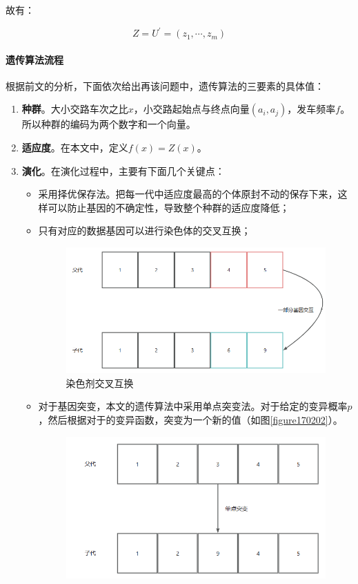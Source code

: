 故有：

\begin{equation}
    Z = U^{'}=(z_1,\cdots,z_m)
\end{equation}

\paragraph{遗传算法流程}

根据前文的分析，下面依次给出再该问题中，遗传算法的三要素的具体值：

\begin{enumerate}
    \item \textbf{种群}。大小交路车次之比$x$，小交路起始点与终点向量$(a_i, a_j)$，发车频率$f$。所以种群的编码为两个数字和一个向量。
    \item \textbf{适应度}。在本文中，定义$f(x)=Z(x)$。
    \item \textbf{演化}。在演化过程中，主要有下面几个关键点：
    \begin{itemize}
        \item 采用择优保存法。把每一代中适应度最高的个体原封不动的保存下来，这样可以防止基因的不确定性，导致整个种群的适应度降低；
        \item 只有对应的数据基因可以进行染色体的交叉互换；
        \begin{figure}[h]
            \centering
            \includegraphics[scale=0.4]{res/figure170220.png}
            \caption{染色剂交叉互换}
            \label{figure170220}
        \end{figure}
        \item 对于基因突变，本文的遗传算法中采用单点突变法。对于给定的变异概率$p$，然后根据对于的变异函数，突变为一个新的值（如图\ref{figure170202}）。
        \begin{figure}[h]
            \centering
            \includegraphics[scale=0.4]{res/figure170202.png}

\end{figure}
\end{itemize}
\end{enumerate}
